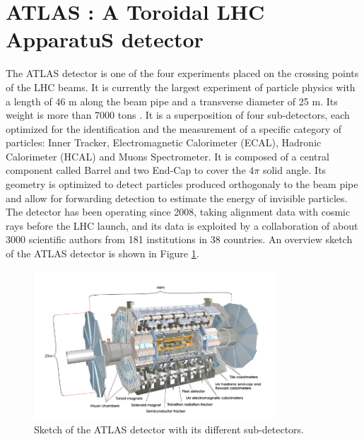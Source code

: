 \section{ATLAS : A Toroidal LHC ApparatuS detector}
\label{chap2:ATLAS}
The ATLAS detector is one of the four experiments placed on the crossing points of the LHC beams. It is currently the largest experiment of particle physics with a length of 46 m along the beam pipe and a transverse diameter of 25 m. Its weight is more than 7000 tons \cite{ATLAS_Exp}. It is a superposition of four sub-detectors, each optimized for the identification and the measurement of a specific category of particles: Inner Tracker, Electromagnetic Calorimeter (ECAL), Hadronic Calorimeter (HCAL) and Muons Spectrometer. It is composed of a central component called Barrel and two End-Cap to cover the $4\pi$ solid angle. Its geometry is optimized to detect particles produced orthogonaly to the beam pipe and allow for forwarding detection to estimate the energy of invisible particles. The detector has been operating since 2008, taking alignment data with cosmic rays before the LHC launch, and its data is exploited by a collaboration of about 3000 scientific authors from 181 institutions in 38 countries. An overview sketch of the ATLAS detector is shown in Figure \ref{fig:chap2:ATLAS:Img}.
\begin{figure}[htbp]
    \centering
    \includegraphics[width=0.8\textwidth]{Ch2/Img/ATLAS_sketch.png}
    \caption{Sketch of the ATLAS detector with its different sub-detectors.}
    \label{fig:chap2:ATLAS:Img}
\end{figure}

